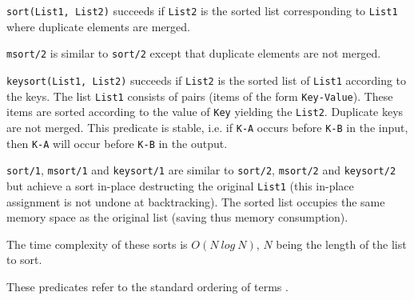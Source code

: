 \Description

\texttt{sort(List1, List2)} succeeds if \texttt{List2} is the
sorted list corresponding to \texttt{List1} where duplicate elements are
merged.

\texttt{msort/2} is similar to \texttt{sort/2} except that duplicate elements
are not merged.

\texttt{keysort(List1, List2)} succeeds if \texttt{List2} is the
sorted list of \texttt{List1} according to the keys. The list \texttt{List1}
consists of pairs (items of the form \texttt{Key-Value}). These items are sorted
according to the value of \texttt{Key} yielding the \texttt{List2}. Duplicate
keys are not merged. This predicate is stable, i.e. if \texttt{K-A} occurs
before \texttt{K-B} in the input, then \texttt{K-A} will occur before
\texttt{K-B} in the output.

\texttt{sort/1}, \texttt{msort/1} and \texttt{keysort/1} are similar to
\texttt{sort/2}, \texttt{msort/2} and \texttt{keysort/2} but achieve a sort
in-place destructing the original \texttt{List1} (this in-place assignment is
not undone at backtracking). The sorted list occupies the same memory space
as the original list (saving thus memory consumption).

The time complexity of these sorts is $O(N~log~N)$, $N$ being the length of
the list to sort.

These predicates refer to the standard ordering of terms
.

\begin{PlErrors}







\end{PlErrors}

